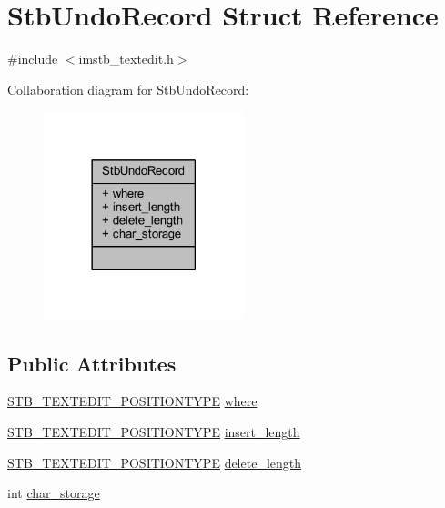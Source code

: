 \hypertarget{struct_stb_undo_record}{}\section{Stb\+Undo\+Record Struct Reference}
\label{struct_stb_undo_record}


{\ttfamily \#include $<$imstb\+\_\+textedit.\+h$>$}



Collaboration diagram for Stb\+Undo\+Record\+:
\nopagebreak
\begin{figure}[H]
\begin{center}
\leavevmode
\includegraphics[width=165pt]{struct_stb_undo_record__coll__graph}
\end{center}
\end{figure}
\subsection*{Public Attributes}
\begin{DoxyCompactItemize}
\item 
\mbox{\hyperlink{imstb__textedit_8h_a5d0c1b8751b6517e3d817f2a025ed654}{S\+T\+B\+\_\+\+T\+E\+X\+T\+E\+D\+I\+T\+\_\+\+P\+O\+S\+I\+T\+I\+O\+N\+T\+Y\+PE}} \mbox{\hyperlink{struct_stb_undo_record_a49e87adbb75a18ffba1f853ac974b31d}{where}}
\item 
\mbox{\hyperlink{imstb__textedit_8h_a5d0c1b8751b6517e3d817f2a025ed654}{S\+T\+B\+\_\+\+T\+E\+X\+T\+E\+D\+I\+T\+\_\+\+P\+O\+S\+I\+T\+I\+O\+N\+T\+Y\+PE}} \mbox{\hyperlink{struct_stb_undo_record_a1916780aa21b7be61be2492fda2df9cc}{insert\+\_\+length}}
\item 
\mbox{\hyperlink{imstb__textedit_8h_a5d0c1b8751b6517e3d817f2a025ed654}{S\+T\+B\+\_\+\+T\+E\+X\+T\+E\+D\+I\+T\+\_\+\+P\+O\+S\+I\+T\+I\+O\+N\+T\+Y\+PE}} \mbox{\hyperlink{struct_stb_undo_record_a39c1e6f00368b5120114256a17b859cd}{delete\+\_\+length}}
\item 
int \mbox{\hyperlink{struct_stb_undo_record_ab317aa50c7a222ece13840a4b65167c0}{char\+\_\+storage}}
\end{DoxyCompactItemize}


